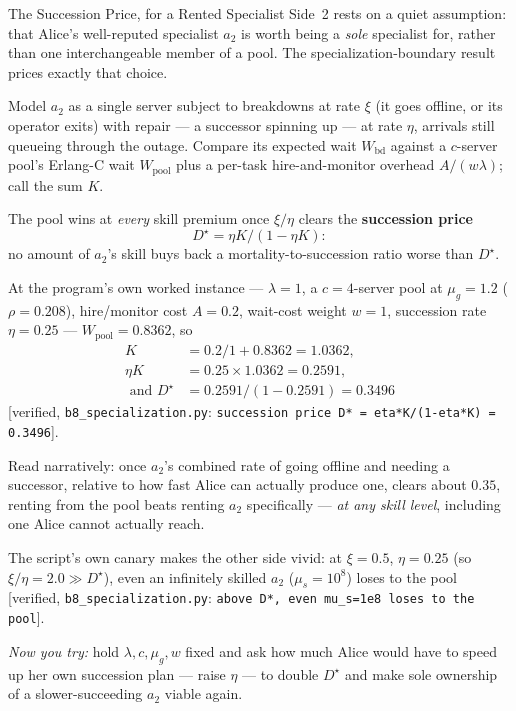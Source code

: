 \documentclass[11pt,a4paper]{article}
\theoremstyle{definition}
\theoremstyle{definition}
\theoremstyle{remark}
\begin{document}
%
\begin{pdexample}{The Succession Price, for a Rented Specialist}
\setlength{\parskip}{4pt plus 1pt}
Side~2 rests on a quiet assumption: that Alice's well-reputed specialist $a_2$ is
worth being a \emph{sole} specialist for, rather than one interchangeable member
of a pool. The specialization-boundary result prices exactly that choice.

Model
$a_2$ as a single server subject to breakdowns at rate $\xi$ (it goes offline, or
its operator exits) with repair --- a successor spinning up --- at rate $\eta$,
arrivals still queueing through the outage. Compare its expected wait
$W_{\mathrm{bd}}$ against a $c$-server pool's Erlang-C wait $W_{\mathrm{pool}}$
plus a per-task hire-and-monitor overhead $A/(w\lambda)$; call the sum $K$.

The
pool wins at \emph{every} skill premium once $\xi/\eta$ clears the
\textbf{succession price} \[
D^\star=\eta K/(1-\eta K):
\] no amount of $a_2$'s skill
buys back a mortality-to-succession ratio worse than $D^\star$.

At the program's
own worked instance --- $\lambda=1$, a $c{=}4$-server pool at $\mu_g=1.2$
($\rho=0.208$), hire/monitor cost $A=0.2$, wait-cost weight $w=1$, succession
rate $\eta=0.25$ --- $W_{\mathrm{pool}}=0.8362$, so \[
\begin{aligned}
K &=0.2/1+0.8362=1.0362,\\
\eta K &=0.25\times1.0362=0.2591,\\
\text{ and }D^\star &=0.2591/(1-0.2591)=0.3496
\end{aligned}
\]
[verified, \texttt{b8\_specialization.py}: \texttt{succession price D* =
eta*K/(1-eta*K) = 0.3496}].

Read narratively: once $a_2$'s combined rate of
going offline and needing a successor, relative to how fast Alice can actually
produce one, clears about $0.35$, renting from the pool beats renting $a_2$
specifically --- \emph{at any skill level}, including one Alice cannot actually
reach.

The script's own canary makes the other side vivid: at $\xi=0.5$,
$\eta=0.25$ (so $\xi/\eta=2.0\gg D^\star$), even an infinitely skilled $a_2$
($\mu_s=10^8$) loses to the pool [verified, \texttt{b8\_specialization.py}:
\texttt{above D*, even mu\_s=1e8 loses to the pool}].

\emph{Now you try:} hold
$\lambda,c,\mu_g,w$ fixed and ask how much Alice would have to speed up her own
succession plan --- raise $\eta$ --- to double $D^\star$ and make sole ownership
of a slower-succeeding $a_2$ viable again.
\end{pdexample}
\end{document}
